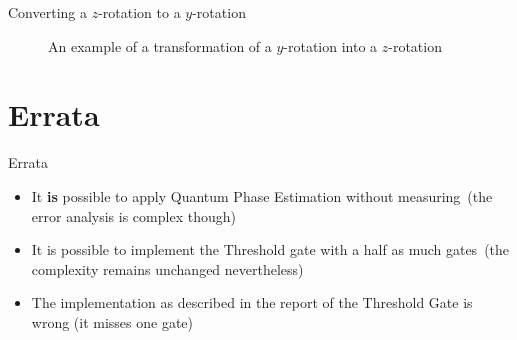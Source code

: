 \documentclass{beamer}
\begin{document}
\begin{frame}{Converting a $z$-rotation to a $y$-rotation}
    \begin{figure}[ht]
        \centering
        \begin{animateinline}{24}
        \end{animateinline}
        \caption{An example of a transformation of a $y$-rotation into a $z$-rotation}
    \end{figure}
\end{frame}

\section{Errata}

\begin{frame}{Errata}
    \begin{itemize}
        \item It \textbf{is} possible to apply Quantum Phase Estimation without measuring\pause\ (the error analysis is complex though)\pause
        \item It is possible to implement the Threshold gate with a half as much gates\pause\ (the complexity remains unchanged nevertheless)
        \item The implementation as described in the report of the Threshold Gate is wrong (it misses one gate)
    \end{itemize}
\end{frame}
\end{document}

